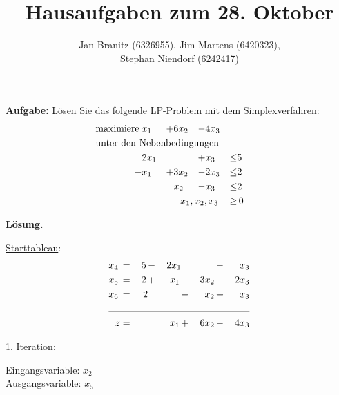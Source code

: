 \documentclass[10pt,a4paper,oneside,ngerman,numbers=noenddot]{scrartcl}
\begin{document}
\author{Jan Branitz (6326955), Jim Martens (6420323),\\
Stephan Niendorf (6242417)}
\title{Hausaufgaben zum 28. Oktober}
\maketitle
\section{} %
	\subsection{} %
		\textbf{Aufgabe:} Lösen Sie das folgende LP-Problem mit dem Simplexverfahren:
		\begin{alignat*}{4}
			\text{maximiere}\; & x_{1} &+& 6x_{2} &-& 4x_{3} && \\
			\multicolumn{8}{l}{\text{unter den Nebenbedingungen}} && \\
			\;& 2x_{1} && &+& x_{3} &\leq & 5 \\
			\;-& x_{1} &+& 3x_{2} &-& 2x_{3} &\leq & 2 \\
			\;& && x_{2} &-& x_{3} &\leq & 2 \\
			\multicolumn{6}{r}{$x_{1}, x_{2}, x_{3}$} \,&\geq &\, 0
		\end{alignat*}
		
		\textbf{Lösung.}
		
		\underline{Starttableau}:
		\begin{alignat*}{5}
			x_{4} \,&=&\, 5 \,&-&\, 2x_{1} && &-&\, x_{3} \\
			x_{5} \,&=&\, 2 \,&+&\, x_{1} \,&-&\, 3x_{2} \,&+&\, 2x_{3} \\
			x_{6} \,&=&\, 2 && &-&\, x_{2} \,&+&\, x_{3} \\ \cline{1 - 9}
			z &=& && x_{1} \,&+&\, 6x_{2} \,&-&\, 4x_{3}
		\end{alignat*}
		
		\underline{1. Iteration}:
		
		Eingangsvariable: $x_{2}$\\
		Ausgangsvariable: $x_{5}$
		
\end{document}
